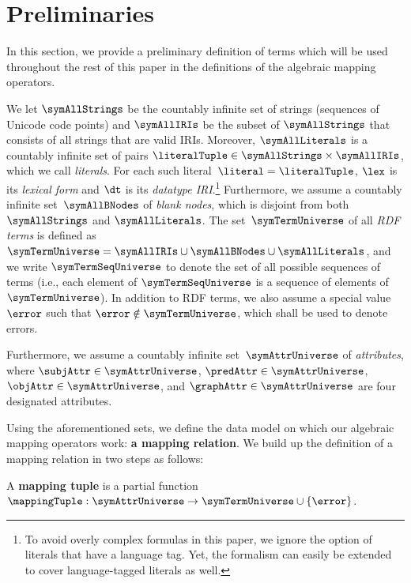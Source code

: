 \section{Preliminaries}
\label{sec:preliminaries}
In this section, we provide a preliminary definition of terms which will be
used throughout the rest of this paper in the definitions of
the algebraic mapping operators.

We let $\symAllStrings$ be the countably infinite set of strings (sequences of
Unicode code points) and $\symAllIRIs$ be the subset of $\symAllStrings$ that
consists of all strings that are valid IRIs. 
Moreover, $\symAllLiterals$ is a countably infinite set of pairs
$ \literalTuple \in \symAllStrings \times \symAllIRIs$, which we
call \emph{literals}. 
For each such literal~$\literal = \literalTuple$, $\lex$ is
its \emph{lexical form} and $\dt$ is its \emph{datatype
IRI}.\footnote{To avoid overly complex formulas in this paper, we ignore the
option of literals that have a language tag. Yet, the formalism can easily be
extended to cover language-tagged literals as well.}
Furthermore, we assume a countably infinite set~$\symAllBNodes$ of \emph{blank
nodes}, which is disjoint from both $\symAllStrings$ and $\symAllLiterals$. 
The set~$\symTermUniverse$ of all \emph{RDF terms} is defined as
$\symTermUniverse = \symAllIRIs \cup \symAllBNodes \cup \symAllLiterals$, and
we write $\symTermSeqUniverse$ to denote the set of all possible sequences of
terms (i.e., each element of $\symTermSeqUniverse$ is a sequence of elements of
$\symTermUniverse$). 
In addition to RDF terms, we also assume a special value $\error$ such that
$\error \notin \symTermUniverse$, which shall be used to denote errors.

Furthermore, we assume a countably infinite set~$\symAttrUniverse$ of
\emph{attributes}, where $\subjAttr \in \symAttrUniverse$,
$\predAttr \in \symAttrUniverse$, $\objAttr \in
\symAttrUniverse$, and $\graphAttr \in \symAttrUniverse$ are four
designated attributes.

Using the aforementioned sets, we define the data model on which our algebraic
mapping operators work: \textbf{a mapping relation}.
We build up the definition of a mapping relation in two steps as follows:


\begin{definition}
	\normalfont
	A \textbf{mapping tuple} is a partial function $\mappingTuple:
		\symAttrUniverse \rightarrow \symTermUniverse \cup \{\error\}$.
\end{definition}

